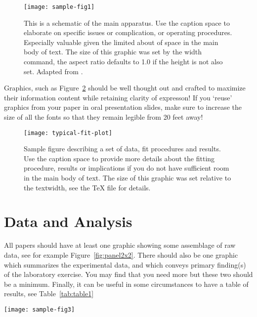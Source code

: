 \begin{figure}[h]
\texttt{[image: sample-fig1]}
\caption{This is a schematic of the main apparatus.  Use the caption
space to elaborate on specific issues or complication, or operating
procedures.  Especially valuable given the limited about of space in
the main body of text.  The size of this graphic was set by the width
command, the aspect ratio defaults to 1.0 if the height is not also
set. Adapted from \cite{melissinos1966,melissinos2003}.\label{fig:samplefig}}
\end{figure}

Graphics, such as Figure~\ref{fig:calibration} should be well thought
out and crafted to maximize their information content while retaining
clarity of expresson!  If you `reuse' graphics from your paper in oral
presentation slides, make sure to increase the size of all the fonts
so that they remain legible from 20 feet away!

\begin{figure}
\texttt{[image: typical-fit-plot]}
\caption{Sample figure describing a set of data, fit procedures and
results. Use the caption space to provide more details about the
fitting procedure, results or implications if you do not have
sufficient room in the main body of text.  The size of this graphic
was set relative to the textwidth, see the TeX file for details.}
\label{fig:calibration}
\end{figure}

\section{Data and Analysis}

All papers should have at least one graphic showing some assemblage of
raw data, see for example Figure~\ref{fig:panel2x2}. There should also
be one graphic which summarizes the experimental data, and which
conveys primary finding(s) of the laboratory exercise.  You may find
that you need more but these two should be a minimum.  Finally, it can
be useful in some circumstances to have a table of results, see
Table~\ref{tab:table1}


\begin{figure*}[htb]
\texttt{[image: sample-fig3]}
\caption{Sample paneled figure created in Matlab using the
subplot(2,2,x) command where x is the element of the plot array into
which all subsequent commands such as plot(x,y) and xlabel('Volts'),
etc. get processed.  Use the caption space to provide more details
about the data, their acquisition or how they were processed if you do
not have sufficient room in the main body of text.  Figures can be
rotated using the angle command, see the TeX file for details.  If a
figure is to be placed after the main text use the ``figure*'' option
to make it extend over two columns, see the \LaTeX file for how this
was done.}
\label{fig:panel2x2}
\end{figure*}

